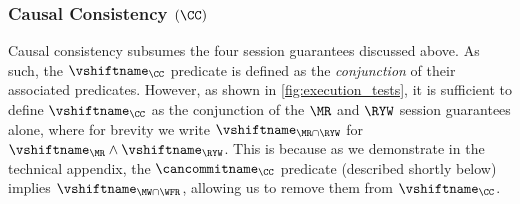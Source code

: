

%



\subsubsection{Causal Consistency $(\CC)$}
Causal consistency subsumes the  four session guarantees discussed above. 
As such, the $\vshiftname_\CC$ predicate is defined as the \emph{conjunction} of their associated \vshiftname predicates.
However, as shown in  \cref{fig:execution_tests}, it is sufficient to define $\vshiftname_\CC$
as the conjunction of the $\MR$ and $\RYW$ session guarantees alone, where for brevity we 
write $\vshiftname_{\MR \cap \RYW}$ for  $\vshiftname_{\MR} \land \vshiftname_{\RYW}$.
This is because as we demonstrate in the technical appendix, the $\cancommitname_{\CC}$ predicate (described shortly below) implies $\vshiftname_{\MW \cap \WFR}$, allowing us to remove them from $\vshiftname_{\CC}$.

